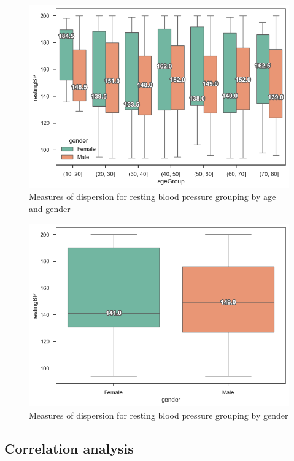 \begin{figure}
    \caption{Measures of dispersion for resting blood pressure grouping by age and gender}\label{boxplot-bp-age}
    \centering
    \includegraphics[width=\linewidth]{media/boxplot-07-agegroup-gender-bp.png}
\end{figure}

\begin{figure}
    \caption{Measures of dispersion for resting blood pressure grouping by gender}\label{boxplot-bp-gender}
    \centering
    \includegraphics[width=\linewidth]{media/boxplot-08-gender-bp.png}
\end{figure}


\subsection{Correlation analysis}


